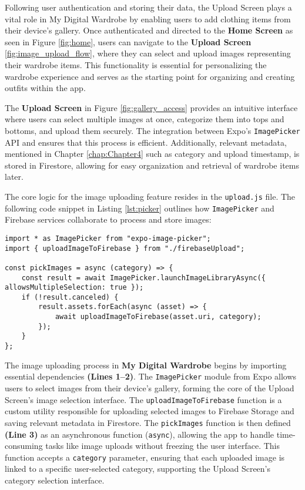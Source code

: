 Following user authentication and storing their data, the Upload Screen plays a vital role in My Digital Wardrobe by enabling users to add clothing items from their device’s gallery. Once authenticated and directed to the \textbf{Home Screen} as seen in Figure \ref{fig:home}, users can navigate to the \textbf{Upload Screen} \ref{fig:image_upload_flow}, where they can select and upload images representing their wardrobe items. This functionality is essential for personalizing the wardrobe experience and serves as the starting point for organizing and creating outfits within the app.

The \textbf{Upload Screen} in Figure \ref{fig:gallery_access} provides an intuitive interface where users can select multiple images at once, categorize them into tops and bottoms, and upload them securely. The integration between Expo’s  \texttt{ImagePicker} API and ensures that this process is efficient. Additionally, relevant metadata, mentioned in Chapter \ref{chap:Chapter4} such as category and upload timestamp, is stored in Firestore, allowing for easy organization and retrieval of wardrobe items later.

The core logic for the image uploading feature resides in the \texttt{upload.js} file. The following code snippet in Listing \ref{lst:picker} outlines how \texttt{ImagePicker} and Firebase services collaborate to process and store images:
\begin{lstlisting}[caption={Image picker integration in \texttt{ upload.js}},label=lst:picker]
import * as ImagePicker from "expo-image-picker";
import { uploadImageToFirebase } from "./firebaseUpload";

const pickImages = async (category) => {
    const result = await ImagePicker.launchImageLibraryAsync({ allowsMultipleSelection: true });
    if (!result.canceled) {
        result.assets.forEach(async (asset) => {
            await uploadImageToFirebase(asset.uri, category);
        });
    }
};
\end{lstlisting}

The image uploading process in \textbf{My Digital Wardrobe} begins by importing essential dependencies \textbf{(Lines 1–2)}. The \texttt{ImagePicker} module from Expo allows users to select images from their device’s gallery, forming the core of the Upload Screen's image selection interface. The \texttt{uploadImageToFirebase} function is a custom utility responsible for uploading selected images to Firebase Storage and saving relevant metadata in Firestore. The \texttt{pickImages} function is then defined \textbf{(Line 3)} as an asynchronous function (\texttt{async}), allowing the app to handle time-consuming tasks like image uploads without freezing the user interface. This function accepts a \texttt{category} parameter, ensuring that each uploaded image is linked to a specific user-selected category, supporting the Upload Screen's category selection interface.

